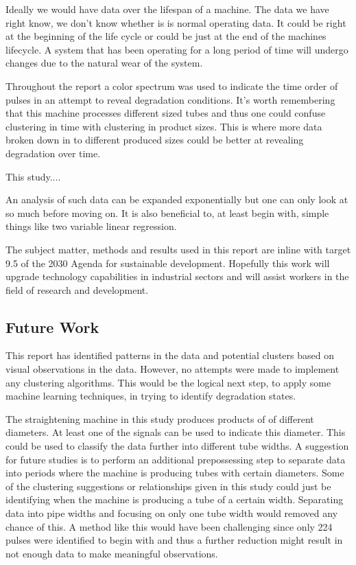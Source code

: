\documentclass[]{article}
\begin{document}
Ideally we would have data over the lifespan of a machine. The data we have right know, we don't know whether is is normal operating data. It could be right at the beginning of the life cycle or could be just at the end of the machines lifecycle. A system that has been operating for a long period of time will undergo changes due to the natural wear of the system.

Throughout the report a color spectrum was used to indicate the time order of pulses in an attempt to reveal degradation conditions. It's worth remembering that this machine processes different sized tubes and thus one could confuse clustering in time with clustering in product sizes. This is where more data broken down in to different produced sizes could be better at revealing degradation over time.

This study....

An analysis of such data can be expanded exponentially but one can only look at so much before moving on. It is also beneficial to, at least begin with, simple things like two variable linear regression.

The subject matter, methods and results used in this report are inline with target 9.5 of the 2030 Agenda for sustainable development\cite{united2015department}. Hopefully this work will upgrade technology capabilities in industrial sectors and will assist workers in the field of research and development. 

\subsection{Future Work}
This report has identified patterns in the data and potential clusters based on visual observations in the data. However, no attempts were made to implement any clustering algorithms. This would be the logical next step, to apply some machine learning techniques, in trying to identify degradation states.

The straightening machine in this study produces products of of different diameters. At least one of the signals can be used to indicate this diameter. This could be used to classify the data further into different tube widths. A suggestion for future studies is to perform an additional prepossessing step to separate data into periods where the machine is producing tubes with certain diameters. Some of the clustering suggestions or relationships given in this study could just be identifying when the machine is producing a tube of a certain width. Separating data into pipe widths and focusing on only one tube width would removed any chance of this. A method like this would have been challenging since only 224 pulses were identified to begin with and thus a further reduction might result in not enough data to make meaningful observations.
\end{document}
